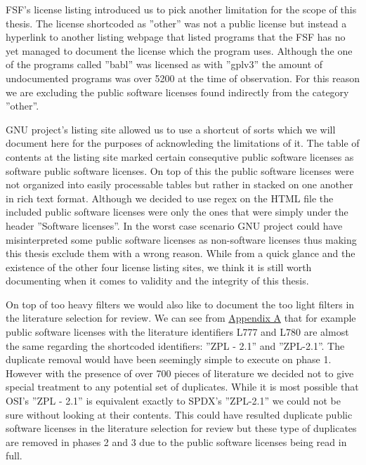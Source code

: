 FSF's license listing introduced us to pick another limitation for the scope of this thesis. The license shortcoded as ''other'' was not a public license but instead a hyperlink to another listing webpage that listed programs that the FSF has no yet managed to document the license which the program uses. Although the one of the programs called ''babl'' was licensed as with ''gplv3'' the amount of undocumented programs was over 5200 at the time of observation. For this reason we are excluding the public software licenses found indirectly from the category ''other''.

GNU project's listing site allowed us to use a shortcut of sorts which we will document here for the purposes of acknowleding the limitations of it. The table of contents at the listing site marked certain consequtive public software licenses as software public software licenses. On top of this the public software licenses were not organized into easily processable tables but rather in stacked on one another in rich text format. Although we decided to use regex on the HTML file the included public software licenses were only the ones that were simply under the header ''Software licenses''. In the worst case scenario GNU project could have misinterpreted some public software licenses as non-software licenses thus making this thesis exclude them with a wrong reason. While from a quick glance and the existence of the other four license listing sites, we think it is still worth documenting when it comes to validity and the integrity of this thesis.

On top of too heavy filters we would also like to document the too light filters in the literature selection for review. We can see from \hyperref[appendix:a]{Appendix A} that for example public software licenses with the literature identifiers L777 and L780 are almost the same regarding the shortcoded identifiers: ''ZPL - 2.1'' and ''ZPL-2.1''. The duplicate removal would have been seemingly simple to execute on phase 1. However with the presence of over 700 pieces of literature we decided not to give special treatment to any potential set of duplicates. While it is most possible that OSI's ''ZPL - 2.1'' is equivalent exactly to SPDX's ''ZPL-2.1'' we could not be sure without looking at their contents. This could have resulted duplicate public software licenses in the literature selection for review but these type of duplicates are removed in phases 2 and 3 due to the public software licenses being read in full.

